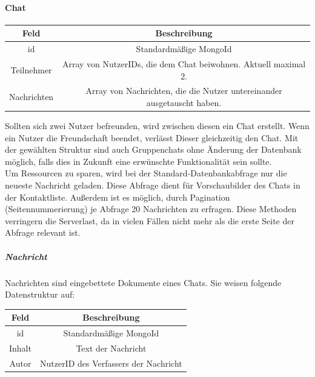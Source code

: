 \paragraph{Chat\\}
\begin{center}
    \begin{tabular}{ |c|c| }
        \hline
        Feld & Beschreibung  \\
        \hline
        id & Standardmäßige MongoId \\
        Teilnehmer & Array von NutzerIDs, die dem Chat beiwohnen. Aktuell maximal 2. \\
        Nachrichten & Array von Nachrichten, die die Nutzer untereinander ausgetauscht haben. \\
        \hline
    \end{tabular}
\end{center}
Sollten sich zwei Nutzer befreunden, wird zwischen diesen ein Chat erstellt.
Wenn ein Nutzer die Freundschaft beendet, verlässt Dieser gleichzeitig den Chat. 
Mit der gewählten Struktur sind auch Gruppenchats ohne Änderung der Datenbank möglich, falls dies in Zukunft eine erwünschte Funktionalität sein sollte.\\
Um Ressourcen zu sparen, wird bei der Standard-Datenbankabfrage nur die neueste Nachricht geladen.
Diese Abfrage dient für Vorschaubilder des Chats in der Kontaktliste.
Außerdem ist es möglich, durch Pagination (Seitennummerierung) je Abfrage 20 Nachrichten zu erfragen.
Diese Methoden verringern die Serverlast, da in vielen Fällen nicht mehr als die erste Seite der Abfrage relevant ist.\\

\subparagraph{Nachricht\\}
Nachrichten sind eingebettete Dokumente eines Chats.
Sie weisen folgende Datenstruktur auf:
\begin{center}
    \begin{tabular}{ |c|c| }
        \hline
        Feld & Beschreibung  \\
        \hline
        id & Standardmäßige MongoId \\
        Inhalt & Text der Nachricht \\
        Autor & NutzerID des Verfassers der Nachricht \\
        \hline
    \end{tabular}
\end{center}

